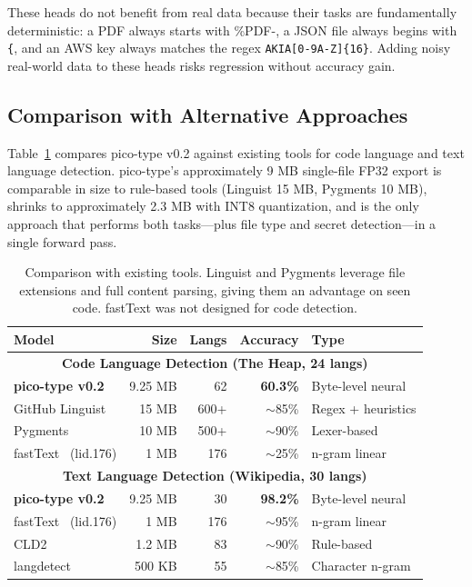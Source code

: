 \documentclass[11pt,a4paper]{article}
\begin{document}
These heads do not benefit from real data because their tasks are fundamentally deterministic: a PDF always starts with \%PDF-, a JSON file always begins with \texttt{\{}, and an AWS key always matches the regex \texttt{AKIA[0-9A-Z]\{16\}}.
Adding noisy real-world data to these heads risks regression without accuracy gain.

\subsection{Comparison with Alternative Approaches}

Table~\ref{tab:comparison} compares pico-type v0.2 against existing tools for code language and text language detection.
pico-type's approximately 9 MB single-file FP32 export is comparable in size to rule-based tools (Linguist 15 MB, Pygments 10 MB), shrinks to approximately 2.3 MB with INT8 quantization, and is the only approach that performs both tasks---plus file type and secret detection---in a single forward pass.

\begin{table}[h]
\centering
\begin{tabular}{lrrrl}
\toprule
Model & Size & Langs & Accuracy & Type \\
\midrule
\multicolumn{5}{c}{\textbf{Code Language Detection (The Heap, 24 langs)}} \\
\midrule
\textbf{pico-type v0.2} & 9.25 MB & 62 & \textbf{60.3\%} & Byte-level neural \\
GitHub Linguist~\cite{linguist} & 15 MB  & 600+ & $\sim$85\% & Regex + heuristics \\
Pygments~\cite{pygments}        & 10 MB  & 500+ & $\sim$90\% & Lexer-based \\
fastText~\cite{fasttext} (lid.176) & 1 MB   & 176  & $\sim$25\% & n-gram linear \\
\midrule
\multicolumn{5}{c}{\textbf{Text Language Detection (Wikipedia, 30 langs)}} \\
\midrule
\textbf{pico-type v0.2} & 9.25 MB & 30 & \textbf{98.2\%} & Byte-level neural \\
fastText~\cite{fasttext} (lid.176) & 1 MB   & 176 & $\sim$95\% & n-gram linear \\
CLD2~\cite{cld2}       & 1.2 MB & 83  & $\sim$90\% & Rule-based \\
langdetect             & 500 KB & 55  & $\sim$85\% & Character n-gram \\
\bottomrule
\end{tabular}
\caption{\label{tab:comparison} Comparison with existing tools. Linguist and Pygments leverage file extensions and full content parsing, giving them an advantage on seen code. fastText was not designed for code detection.}
\end{table}
\end{document}
